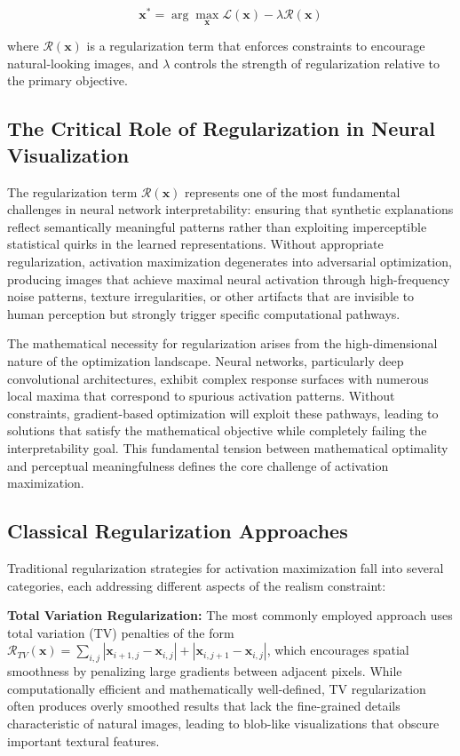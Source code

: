 \documentclass[licencjacka,en]{pracamgr}
\begin{document}
\begin{equation}
\mathbf{x}^* = \arg\max_{\mathbf{x}} \mathcal{L}(\mathbf{x}) - \lambda \mathcal{R}(\mathbf{x})
\label{eq:activation_maximization}
\end{equation}

where $\mathcal{R}(\mathbf{x})$ is a regularization term that enforces constraints to encourage natural-looking images, and $\lambda$ controls the strength of regularization relative to the primary objective.

\subsection{The Critical Role of Regularization in Neural Visualization}

The regularization term $\mathcal{R}(\mathbf{x})$ represents one of the most fundamental challenges in neural network interpretability: ensuring that synthetic explanations reflect semantically meaningful patterns rather than exploiting imperceptible statistical quirks in the learned representations. Without appropriate regularization, activation maximization degenerates into adversarial optimization, producing images that achieve maximal neural activation through high-frequency noise patterns, texture irregularities, or other artifacts that are invisible to human perception but strongly trigger specific computational pathways.

The mathematical necessity for regularization arises from the high-dimensional nature of the optimization landscape. Neural networks, particularly deep convolutional architectures, exhibit complex response surfaces with numerous local maxima that correspond to spurious activation patterns. Without constraints, gradient-based optimization will exploit these pathways, leading to solutions that satisfy the mathematical objective while completely failing the interpretability goal. This fundamental tension between mathematical optimality and perceptual meaningfulness defines the core challenge of activation maximization.

\subsection{Classical Regularization Approaches}

Traditional regularization strategies for activation maximization fall into several categories, each addressing different aspects of the realism constraint:

\textbf{Total Variation Regularization:} The most commonly employed approach uses total variation (TV) penalties of the form $\mathcal{R}_{TV}(\mathbf{x}) = \sum_{i,j} |\mathbf{x}_{i+1,j} - \mathbf{x}_{i,j}| + |\mathbf{x}_{i,j+1} - \mathbf{x}_{i,j}|$, which encourages spatial smoothness by penalizing large gradients between adjacent pixels. While computationally efficient and mathematically well-defined, TV regularization often produces overly smoothed results that lack the fine-grained details characteristic of natural images, leading to blob-like visualizations that obscure important textural features.
\end{document}

